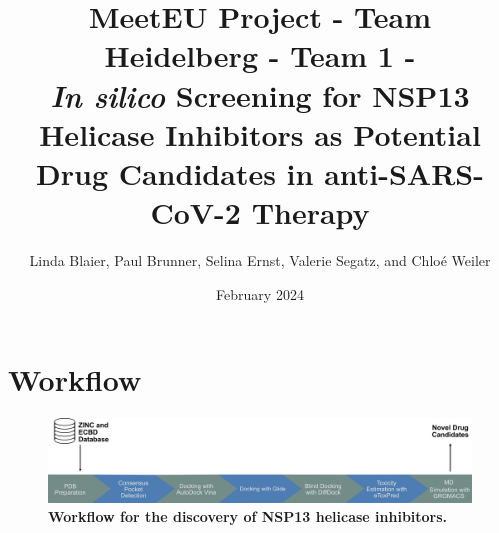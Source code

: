 \documentclass[11pt, letterpaper, titlepage]{article}
\title{MeetEU Project - Team Heidelberg - Team 1 - \\ \textit{In silico} Screening for NSP13 Helicase Inhibitors as Potential Drug Candidates in anti-SARS-CoV-2 Therapy}
\author{Linda Blaier, Paul Brunner, Selina Ernst, Valerie Segatz, and Chlo\'{e} Weiler}
\date{February 2024}
\begin{document}
\maketitle

\ihead{\headmark}
\cfoot{\pagemark}   %

\section{Workflow}

\begin{figure}[h]
  \centering
  \includegraphics[width=\textwidth]{Workflow_MeetEU.pdf}
  \caption*{\textbf{Workflow for the discovery of NSP13 helicase inhibitors.}}
  \label{workflow}
\end{figure}

\setcounter{figure}{0}
\renewcommand{\thefigure}{\arabic{figure}}
\end{document}
